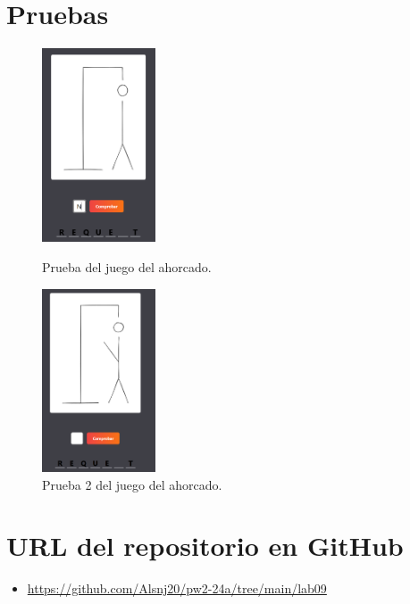 \documentclass{article}
\begin{document}
\section{Pruebas}
\begin{figure}[H]
	\centering
	\includegraphics[width=0.3\textwidth,keepaspectratio]{img/prueba.png}
	\caption{Prueba del juego del ahorcado.}
	\centering
	\includegraphics[width=0.3\textwidth,keepaspectratio]{img/prueba2.png}
	\caption{Prueba 2 del juego del ahorcado.}
\end{figure}
\pagebreak

\section{URL del repositorio en GitHub}
\begin{itemize}
	\item \url{https://github.com/Alsnj20/pw2-24a/tree/main/lab09}
\end{itemize}
\end{document}
